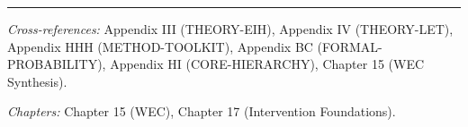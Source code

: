 \nocite{bcm_master}



\vspace{1em}
\hrule
\vspace{0.5em}

\noindent\textit{Cross-references:}
Appendix III (THEORY-EIH),
Appendix IV (THEORY-LET),
Appendix HHH (METHOD-TOOLKIT),
Appendix BC (FORMAL-PROBABILITY),
Appendix HI (CORE-HIERARCHY),
Chapter 15 (WEC Synthesis).

\noindent\textit{Chapters:} Chapter 15 (WEC), Chapter 17 (Intervention Foundations).



